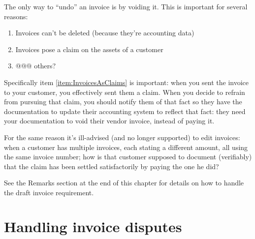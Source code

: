 The only way to ``undo'' an invoice is by voiding it. This is important for several
reasons:

\begin{enumerate}
\item Invoices can't be deleted (because they're accounting data)
\item Invoices pose a claim on the assets of a customer
\label{item:InvoicesAsClaims}
\item @@@ others?
\end{enumerate}

Specifically item \ref{item:InvoicesAsClaims} is important: when you sent the invoice
to your customer, you effectively sent them a claim. When you decide to refrain from
pursuing that claim, you should notify them of that fact so they have the documentation
to update their accounting system to reflect that fact: they need your documentation
to void their vendor invoice, instead of paying it.

For the same reason it's ill-advised (and no longer supported) to edit invoices:
when a customer has multiple invoices, each stating a different amount, all
using the same invoice number; how is that customer supposed to document (verifiably)
that the claim has been settled satisfactorily by paying the one he did?

See the Remarks section at the end of this chapter for details on how to handle
the draft invoice requirement.

\section{Handling invoice disputes}
\label{sec-workflows-invoicing-handling-disputes}

